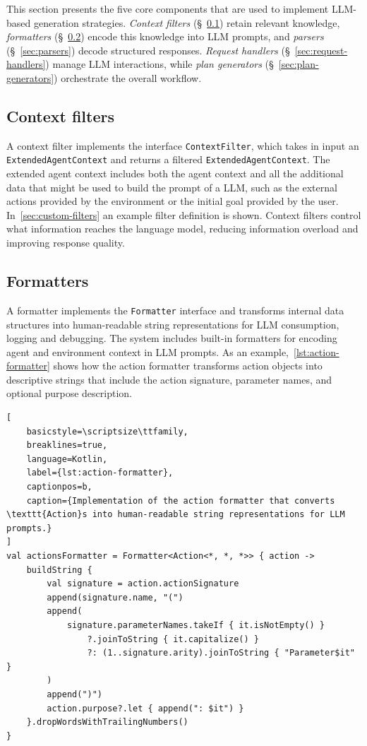\documentclass[12pt,a4paper,openright,twoside]{book}
\begin{document}
This section presents the five core components that are used to implement \ac{LLM}-based generation strategies.
%
\textit{Context filters} (\S~\ref{sec:context-filters}) retain relevant knowledge, \textit{formatters} (\S~\ref{sec:formatters}) encode this knowledge into \ac{LLM} prompts, and \textit{parsers} (\S~\ref{sec:parsers}) decode structured responses. 
%
\textit{Request handlers} (\S~\ref{sec:request-handlers}) manage \ac{LLM} interactions, while \textit{plan generators} (\S~\ref{sec:plan-generators}) orchestrate the overall workflow.

\subsection{Context filters}\label{sec:context-filters}

A context filter implements the interface \texttt{ContextFilter}, which takes in input an \texttt{ExtendedAgentContext} and returns a filtered \texttt{ExtendedAgentContext}. 
%
The extended agent context includes both the agent context and all the additional data that might be used to build the prompt of a \ac{LLM}, such as the external actions provided by the environment or the initial goal provided by the user.
%
In~\cref{sec:custom-filters} an example filter definition is shown.
%
Context filters control what information reaches the language model, reducing information overload and improving response quality.

\subsection{Formatters}\label{sec:formatters}

A formatter implements the \texttt{Formatter} interface and transforms internal data structures into human-readable string representations for LLM consumption, logging and debugging. 
%
The system includes built-in formatters for encoding agent and environment context in LLM prompts.
%
As an example,~\cref{lst:action-formatter} shows how the action formatter transforms action objects into descriptive strings that include the action signature, parameter names, and optional purpose description.

\begin{lstlisting}[
    basicstyle=\scriptsize\ttfamily,
    breaklines=true,
    language=Kotlin,
    label={lst:action-formatter},
    captionpos=b,
    caption={Implementation of the action formatter that converts \texttt{Action}s into human-readable string representations for LLM prompts.}
]
val actionsFormatter = Formatter<Action<*, *, *>> { action ->
    buildString {
        val signature = action.actionSignature
        append(signature.name, "(")
        append(
            signature.parameterNames.takeIf { it.isNotEmpty() }
                ?.joinToString { it.capitalize() }
                ?: (1..signature.arity).joinToString { "Parameter$it" }
        )
        append(")")
        action.purpose?.let { append(": $it") }
    }.dropWordsWithTrailingNumbers()
}
\end{lstlisting}
\end{document}
